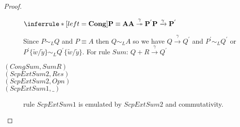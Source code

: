 \begin{proposition}
\begin{proof}
\begin{description}
		\begin{center}
		  $\inferrule* [left=\bf{Cong}]{
		      P\equiv A
		    \\
		      A \stackrel{\gamma}{\twoheadrightarrow} P^{'}
		  }{
		    P \xrightarrow{\gamma} P^{'}
		  }$
		\end{center}
		Since $P\sim_{L}Q$ and $P\equiv A$ then $Q \sim_{L} A$ so we have $Q \xrightarrow{\gamma} Q^{'}$ and $P^{'} \sim_{L} Q^{'}$ or $P^{'}\{\tilde{w}/\tilde{y}\} \sim_{L} Q^{'}\{\tilde{w}/\tilde{y}\}$. For rule $Sum$: $Q+R \xrightarrow{\gamma} Q^{'}$
	      \item[$(CongSum, SumR)$]
	      \item[$(ScpExtSum2, Res)$]
	      \item[$(ScpExtSum2, Opn)$]
	      \item[$(ScpExtSum1, \_)$] rule $ScpExtSum1$ is emulated by $ScpExtSum2$ and commutativity.

\end{description}
\end{proof}
\end{proposition}
